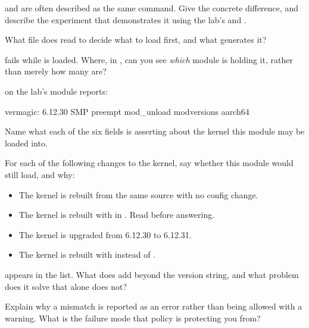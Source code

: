   and  are often described as the same command. Give the
concrete difference, and describe the experiment that demonstrates it using the lab's
 and .

 What file does  read to decide what to load first, and what generates it?

  fails while  is loaded. Where, in , can
you see \emph{which} module is holding it, rather than merely how many are?

\label{c4:ex:3}

 on the lab's module reports:

\begin{console}
vermagic: 6.12.30 SMP preempt mod_unload modversions aarch64
\end{console}

 Name what each of the six fields is asserting about the kernel this module may be loaded
into.

 For each of the following changes to the kernel, say whether this module would still load,
and why:
\begin{itemize}
  \item The kernel is rebuilt from the same source with no config change.
  \item The kernel is rebuilt with  in .
    Read  before answering.
  \item The kernel is upgraded from 6.12.30 to 6.12.31.
  \item The kernel is rebuilt with  instead of .
\end{itemize}

  appears in the list. What does  add beyond the
version string, and what problem does it solve that  alone does not?

 Explain why a mismatch is reported as an error rather than being allowed with a warning.
What is the failure mode that policy is protecting you from?

\label{c4:ex:4}

